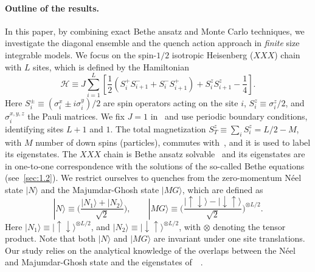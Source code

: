 \documentclass[11pt]{iopart}
\begin{document}
\paragraph*{Outline of the results.} 
In this paper, by combining exact Bethe ansatz and Monte Carlo techniques, we investigate 
the diagonal ensemble and the quench action approach in {\it finite} size integrable models. 
We focus on the spin-$1/2$ isotropic Heisenberg ($XXX$) chain with $L$ sites, which is 
defined by the Hamiltonian 
%
\begin{equation}
\label{xxx-ham}
{\mathcal H}\equiv J\sum\limits_{i=1}^L\left[\frac{1}{2}(S_i^+S^-_{i+1} 
+S_i^{-}S_{i+1}^+)+S_i^zS_{i+1}^z-\frac{1}{4}\right].
\end{equation}
%
Here $S^{\pm}_i\equiv (\sigma_i^x\pm i\sigma_i^y)/2$ are spin operators acting on the 
site $i$, $S_i^z\equiv\sigma_i^z/2$, and $\sigma^{x,y,z}_i$ the Pauli matrices. We 
fix $J=1$ in~ and use periodic boundary conditions, identifying sites 
$L+1$ and $1$. The total magnetization $S_{T}^z\equiv\sum_iS_i^z=L/2-M$, with $M$ number 
of down spins (particles), commutes with~, and it is used to label its 
eigenstates. The $XXX$ chain is Bethe ansatz solvable~\cite{bethe-1931} and its eigenstates 
are in one-to-one correspondence with the solutions of the so-called Bethe equations 
(see~\ref{sec:1.2}). We restrict ourselves to quenches from the zero-momentum N\'eel 
state $|N\rangle$ and the Majumdar-Ghosh state $|MG\rangle$, which are defined as  
%
\begin{equation}
\label{psi0}
|N\rangle\equiv\Big(\frac{|N_1\rangle
+|N_2\rangle}{\sqrt{2}}\Big), \qquad 
|MG\rangle\equiv \Big(\frac{|\uparrow\downarrow\rangle-|\downarrow\uparrow\rangle}
{\sqrt{2}}\Big)^{\otimes L/2}. 
\end{equation}
%
Here $|N_1\rangle\equiv |\uparrow\downarrow\rangle^{\otimes L/2}$, and $|N_2\rangle
\equiv |\downarrow\uparrow\rangle^{\otimes L/2}$, with $\otimes$ denoting the tensor 
product. Note that both $|N\rangle$ and $|MG\rangle$ are invariant under one site 
translations. Our study relies on the analytical knowledge of the overlaps between 
the N\'eel and Majumdar-Ghosh state and the eigenstates of~~\cite{
brockmann-2014,brockmann-2014a,brockmann-2014b,brockmann-2014c,pozsgay-2014a,
piroli-2014}. 
\end{document}
